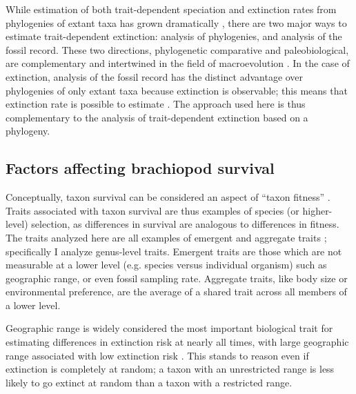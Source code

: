 \documentclass[11pt]{article}
\begin{document}
While estimation of both trait-dependent speciation and extinction rates from phylogenies of extant taxa has grown dramatically \citep{Maddison2007,Fitzjohn2010,Goldberg2011a,Goldberg2005,Rabosky2013,Stadler2013b,Stadler2011a,Stadler2013a}, there are two major ways to estimate trait-dependent extinction: analysis of phylogenies, and analysis of the fossil record. These two directions, phylogenetic comparative and paleobiological, are complementary and intertwined in the field of macroevolution \citep{Rabosky2010b,Jablonski2008a,Hunt2014a}. In the case of extinction, analysis of the fossil record has the distinct advantage over phylogenies of only extant taxa because extinction is observable; this means that extinction rate is possible to estimate \citep{Rabosky2010a,Quental2009,Liow2010a}. The approach used here is thus complementary to the analysis of trait-dependent extinction based on a phylogeny.


\subsection*{Factors affecting brachiopod survival}

Conceptually, taxon survival can be considered an aspect of ``taxon fitness'' \citep{Cooper1984,Palmer2012}. Traits associated with taxon survival are thus examples of species (or higher-level) selection, as differences in survival are analogous to differences in fitness. The traits analyzed here are all examples of emergent and aggregate traits \citep{Jablonski2008a,Rabosky2010b}; specifically I analyze genus-level traits. Emergent traits are those which are not measurable at a lower level (e.g. species versus individual organism) such as geographic range, or even fossil sampling rate. Aggregate traits, like body size or environmental preference, are the average of a shared trait across all members of a lower level.

Geographic range is widely considered the most important biological trait for estimating differences in extinction risk at nearly all times, with large geographic range associated with low extinction risk \citep{Jablonski1986,Jablonski1987,Jablonski2003,Payne2007,Jablonski2008a,Harnik2013,Finnegan2012a}. This stands to reason even if extinction is completely at random; a taxon with an unrestricted range is less likely to go extinct at random than a taxon with a restricted range.
\end{document}
